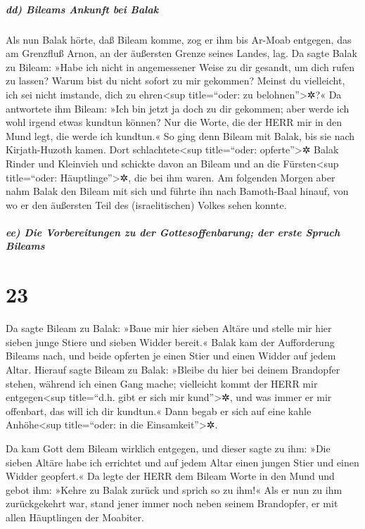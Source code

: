 \hypertarget{dd-bileams-ankunft-bei-balak}{%
\subparagraph{dd) Bileams Ankunft bei
Balak}\label{dd-bileams-ankunft-bei-balak}}

Als nun Balak hörte, daß Bileam komme, zog er ihm bis
Ar-Moab entgegen, das am Grenzfluß Arnon, an der äußersten Grenze seines
Landes, lag. Da sagte Balak zu Bileam: »Habe ich nicht in
angemessener Weise zu dir gesandt, um dich rufen zu lassen? Warum bist
du nicht sofort zu mir gekommen? Meinst du vielleicht, ich sei nicht
imstande, dich zu ehren\textless sup title=``oder: zu
belohnen''\textgreater✲?« Da antwortete ihm Bileam: »Ich
bin jetzt ja doch zu dir gekommen; aber werde ich wohl irgend etwas
kundtun können? Nur die Worte, die der HERR mir in den Mund legt, die
werde ich kundtun.« So ging denn Bileam mit Balak, bis
sie nach Kirjath-Huzoth kamen. Dort
schlachtete\textless sup title=``oder: opferte''\textgreater✲ Balak
Rinder und Kleinvieh und schickte davon an Bileam und an die
Fürsten\textless sup title=``oder: Häuptlinge''\textgreater✲, die bei
ihm waren. Am folgenden Morgen aber nahm Balak den Bileam
mit sich und führte ihn nach Bamoth-Baal hinauf, von wo er den äußersten
Teil des (israelitischen) Volkes sehen konnte.

\hypertarget{ee-die-vorbereitungen-zu-der-gottesoffenbarung-der-erste-spruch-bileams}{%
\subparagraph{ee) Die Vorbereitungen zu der Gottesoffenbarung; der erste
Spruch
Bileams}\label{ee-die-vorbereitungen-zu-der-gottesoffenbarung-der-erste-spruch-bileams}}

\hypertarget{section-22}{%
\section{23}\label{section-22}}

Da sagte Bileam zu Balak: »Baue mir hier sieben Altäre und
stelle mir hier sieben junge Stiere und sieben Widder bereit.«
Balak kam der Aufforderung Bileams nach, und beide
opferten je einen Stier und einen Widder auf jedem Altar.
Hierauf sagte Bileam zu Balak: »Bleibe du hier bei deinem
Brandopfer stehen, während ich einen Gang mache; vielleicht kommt der
HERR mir entgegen\textless sup title=``d.h. gibt er sich mir
kund''\textgreater✲, und was immer er mir offenbart, das will ich dir
kundtun.« Dann begab er sich auf eine kahle Anhöhe\textless sup
title=``oder: in die Einsamkeit''\textgreater✲.

Da kam Gott dem Bileam wirklich entgegen, und dieser sagte
zu ihm: »Die sieben Altäre habe ich errichtet und auf jedem Altar einen
jungen Stier und einen Widder geopfert.« Da legte der HERR
dem Bileam Worte in den Mund und gebot ihm: »Kehre zu Balak zurück und
sprich so zu ihm!« Als er nun zu ihm zurückgekehrt war,
stand jener immer noch neben seinem Brandopfer, er mit allen Häuptlingen
der Moabiter.

